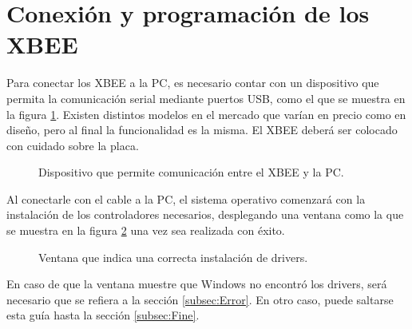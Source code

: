 \section{Conexión y programación de los XBEE} 
Para conectar los XBEE a la PC, es necesario contar con un dispositivo que permita la comunicación serial mediante puertos USB, como el que se muestra en la figura \ref{fig:Board}. Existen distintos modelos en el mercado que varían en precio como en diseño, pero al final la funcionalidad es la misma. El XBEE deberá ser colocado con cuidado sobre la placa. 

\begin{figure}[H] %
\caption{Dispositivo que permite comunicación entre el XBEE y la PC.}
\label{fig:Board}
\end{figure}

Al conectarle con el cable a la PC, el sistema operativo comenzará con la instalación de los controladores necesarios, desplegando una ventana como la que se muestra en la figura \ref{fig:VentanaDeDrivers} una vez sea realizada con éxito.

\begin{figure}[H] %
\caption{Ventana que indica una correcta instalación de drivers.}
\label{fig:VentanaDeDrivers}
\end{figure}

En caso de que la ventana muestre que Windows no encontró los drivers, será necesario que se refiera a la sección \ref{subsec:Error}. En otro caso, puede saltarse esta guía hasta la sección \ref{subsec:Fine}.

